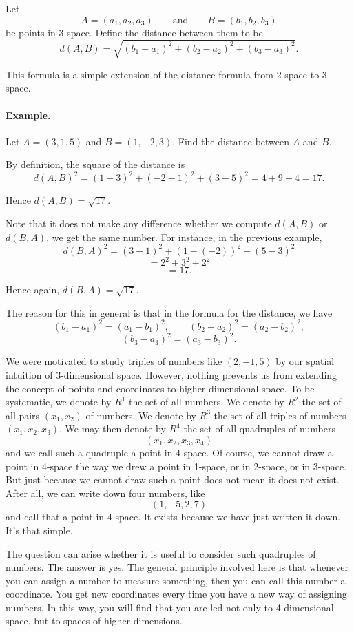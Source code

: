 \documentclass[12pt]{book} %
\begin{document}
Let
\[
A=(a_1,a_2,a_3)\qquad \text{and}\qquad B=(b_1,b_2,b_3)
\]
be points in 3-space. Define the distance between them to be
\[
d(A,B)=\sqrt{(b_1-a_1)^2+(b_2-a_2)^2+(b_3-a_3)^2}.
\]

This formula is a simple extension of the distance formula from 2-space to 3-space.

\paragraph{Example.}
Let $A=(3,1,5)$ and $B=(1,-2,3)$. Find the distance between $A$ and $B$.

By definition, the square of the distance is
\[
d(A,B)^2=(1-3)^2+(-2-1)^2+(3-5)^2=4+9+4=17.
\]

Hence $d(A,B)=\sqrt{17}$.

Note that it does not make any difference whether we compute $d(A,B)$ or $d(B,A)$, we get the same number. For instance, in the previous example,
\[
d(B,A)^2=(3-1)^2+(1-(-2))^2+(5-3)^2
\]
\[
=2^2+3^2+2^2
\]
\[
=17.
\]

Hence again, $d(B,A)=\sqrt{17}$.

The reason for this in general is that in the formula for the distance, we have
\[
(b_1-a_1)^2=(a_1-b_1)^2,\qquad (b_2-a_2)^2=(a_2-b_2)^2,
\]
\[
(b_3-a_3)^2=(a_3-b_3)^2.
\]

We were motivated to study triples of numbers like $(2,-1,5)$ by our spatial intuition of 3-dimensional space. However, nothing prevents us from extending the concept of points and coordinates to higher dimensional space. To be systematic, we denote by $R^1$ the set of all numbers. We denote by $R^2$ the set of all pairs $(x_1,x_2)$ of numbers. We denote by $R^3$ the set of all triples of numbers $(x_1,x_2,x_3)$. We may then denote by $R^4$ the set of all quadruples of numbers
\[
(x_1,x_2,x_3,x_4)
\]
and we call such a quadruple a point in 4-space. Of course, we cannot draw a point in 4-space the way we drew a point in 1-space, or in 2-space, or in 3-space. But just because we cannot draw such a point does not mean it does not exist. After all, we can write down four numbers, like
\[
(1,-5,2,7)
\]
and call that a point in 4-space. It exists because we have just written it down. It's that simple.

The question can arise whether it is useful to consider such quadruples of numbers. The answer is yes. The general principle involved here is that whenever you can assign a number to measure something, then you can call this number a coordinate. You get new coordinates every time you have a new way of assigning numbers. In this way, you will find that you are led not only to 4-dimensional space, but to spaces of higher dimensions.
\end{document}

